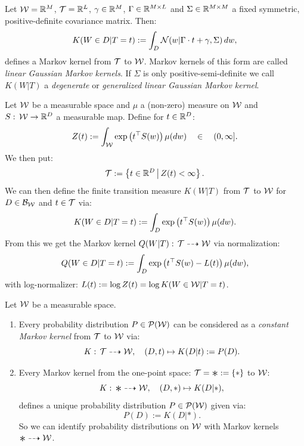 \begin{Eg}
    Let $\mathcal{W} = \mathbb{R}^M$, $\mathcal{T} = \mathbb{R}^L$, $\gamma \in \mathbb{R}^M$, $\Gamma \in \mathbb{R}^{M \times L}$ and $\Sigma \in \mathbb{R}^{M \times M}$ a fixed symmetric, positive-definite covariance matrix. Then:
    \[ K(W \in D|T=t) := \int_D \mathcal{N}(w|\Gamma \cdot t + \gamma,\Sigma) \, dw,  \]
    defines a Markov kernel from $\mathcal{T}$ to $\mathcal{W}$. Markov kernels of this form are called \emph{linear Gaussian Markov kernels}. If $\Sigma$ is only positive-semi-definite we call $K(W|T)$ a \emph{degenerate} or
    \emph{generalized linear Gaussian Markov kernel}.
\end{Eg}

\begin{Eg}
    Let $\mathcal{W}$ be a measurable space and $\mu$ a (non-zero) measure on $\mathcal{W}$ and $S:\,\mathcal{W} \to \mathbb{R}^D$ a measurable map.
    Define for $t \in \mathbb{R}^D$:
    \[ Z(t) := \int_{\mathcal{W}} \exp\left ( t^\top S(w) \right ) \mu(dw) \quad\in \quad (0,\infty].\]
    We then put:
    \[ \mathcal{T} := \left \{ t\in \mathbb{R}^D \,\middle|\, Z(t) < \infty \right \}.\]
    We can then define the finite transition measure $K(W|T)$ from $\mathcal{T}$ to $\mathcal{W}$ 
    for $D \in \mathcal{B}_{\mathcal{W}}$ and $t \in \mathcal{T}$ via:
    \[ K(W \in D|T=t) := \int_D \exp\left ( t^\top S(w) \right ) \mu(dw).  \]
    From this we get the Markov kernel $Q(W|T):\, \mathcal{T} \dashrightarrow \mathcal{W}$ via normalization:
    \[ Q(W \in D|T=t) := \int_D \exp\left ( t^\top S(w) - L(t) \right ) \mu(dw),  \]
    with log-normalizer: $L(t):=\log Z(t) = \log K(W \in \mathcal{W}|T=t)$.
\end{Eg}

\begin{Rem} Let $\mathcal{W}$ be a measurable space.
    \begin{enumerate}
        \item Every probability distribution $P \in \mathcal{P}(\mathcal{W})$ can be considered as a \emph{constant Markov kernel} from $\mathcal{T}$ to $\mathcal{W}$ via:
            \[  K:\, \mathcal{T} \dashrightarrow \mathcal{W},\quad (D,t) \mapsto K(D|t):=P(D).   \]
        \item Every Markov kernel from the  one-point space: $\Tcal=\Asterisk:=\{\ast\}$ to $\mathcal{W}$:
            \[ K:\, \Asterisk \dshto \Wcal,\quad (D,\ast) \mapsto K(D|\ast),\]
            defines a unique probability distribution $P \in \mathcal{P}(\mathcal{W})$ given via:
            \[ P(D):=K(D|\ast).\]
            So we can identify probability distributions on $\mathcal{W}$ with Markov kernels $\Asterisk \dshto \Wcal$.
    \end{enumerate}
\end{Rem}

